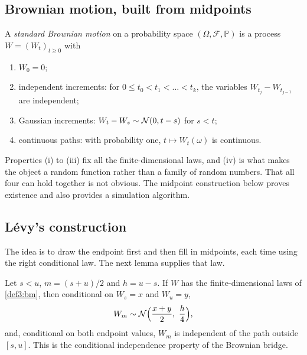 \begin{chapterrefs}
\FloatBarrier
\section{Brownian motion, built from midpoints}
\label{sec3:bm}

\begin{definition}\label{def3:bm}
A \emph{standard Brownian motion} on a probability space $(\Omega,\mathcal F,\mathbb P)$ is a process
$W=(W_t)_{t\ge 0}$ with
\begin{enumerate}[label=(\roman*)]
  \item $W_0=0$;
  \item independent increments: for $0\le t_0<t_1<\dots<t_k$, the variables $W_{t_j}-W_{t_{j-1}}$ are independent;
  \item Gaussian increments: $W_t-W_s\sim\mathcal{N}(0,t-s)$ for $s<t$;
  \item continuous paths: with probability one, $t\mapsto W_t(\omega)$ is continuous.
\end{enumerate}
\end{definition}

Properties (i) to (iii) fix all the finite-dimensional laws, and (iv) is what makes the object a
random function rather than a family of random numbers. That all four can hold together is not
obvious. The midpoint construction below proves existence and also provides a simulation algorithm.

\subsection{L\'evy's construction}

The idea is to draw the endpoint first and then fill in midpoints, each time using the right
conditional law. The next lemma supplies that law.

\begin{lemma}\label{lem3:bridge}
Let $s<u$, $m=(s+u)/2$ and $h=u-s$. If $W$ has the finite-dimensional laws of
\cref{def3:bm}, then conditional on $W_s=x$ and $W_u=y$,
\begin{equation}\label{eq3:bridge}
  W_m \sim \mathcal{N}\Bigl(\frac{x+y}{2},\ \frac h4\Bigr),
\end{equation}
and, conditional on both endpoint values, $W_m$ is independent of the path outside $[s,u]$. This is
the conditional independence property of the Brownian bridge.
\end{lemma}


\end{chapterrefs}
